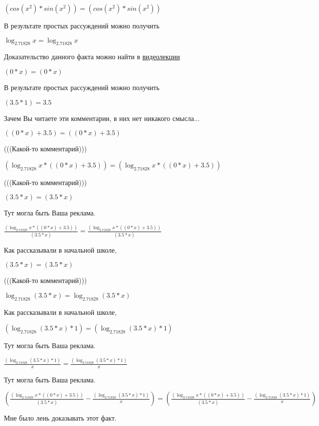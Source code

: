 \documentclass[12pt,a4paper,fleqn]{article}
\theoremstyle{definition}
\begin{document}
$(cos({ x }^{ 2 }) * sin({ x }^{ 2 })) = (cos({ x }^{ 2 }) * sin({ x }^{ 2 }))$

В результате простых рассуждений можно получить

$\log_{ 2.71828 }{ x } = \log_{ 2.71828 }{ x }$

Доказательство данного факта можно найти в \href{https://www.youtube.com/watch?v=dQw4w9WgXcQ}{видеолекции}

$( 0  *  x ) = ( 0  *  x )$

В результате простых рассуждений можно получить

$( 3.5  *  1 ) =  3.5 $

Зачем Вы читаете эти комментарии, в них нет никакого смысла...

$(( 0  *  x ) +  3.5 ) = (( 0  *  x ) +  3.5 )$

(((Какой-то комментарий)))

$(\log_{ 2.71828 }{ x } * (( 0  *  x ) +  3.5 )) = (\log_{ 2.71828 }{ x } * (( 0  *  x ) +  3.5 ))$

(((Какой-то комментарий)))

$( 3.5  *  x ) = ( 3.5  *  x )$

Тут могла быть Ваша реклама.

$\frac{(\log_{ 2.71828 }{ x } * (( 0  *  x ) +  3.5 ))}{( 3.5  *  x )}
 = \frac{(\log_{ 2.71828 }{ x } * (( 0  *  x ) +  3.5 ))}{( 3.5  *  x )}
$

Как рассказывали в начальной школе,

$( 3.5  *  x ) = ( 3.5  *  x )$

(((Какой-то комментарий)))

$\log_{ 2.71828 }{( 3.5  *  x )} = \log_{ 2.71828 }{( 3.5  *  x )}$

Как рассказывали в начальной школе,

$(\log_{ 2.71828 }{( 3.5  *  x )} *  1 ) = (\log_{ 2.71828 }{( 3.5  *  x )} *  1 )$

Тут могла быть Ваша реклама.

$\frac{(\log_{ 2.71828 }{( 3.5  *  x )} *  1 )}{ x }
 = \frac{(\log_{ 2.71828 }{( 3.5  *  x )} *  1 )}{ x }
$

Тут могла быть Ваша реклама.

$(\frac{(\log_{ 2.71828 }{ x } * (( 0  *  x ) +  3.5 ))}{( 3.5  *  x )}
 - \frac{(\log_{ 2.71828 }{( 3.5  *  x )} *  1 )}{ x }
) = (\frac{(\log_{ 2.71828 }{ x } * (( 0  *  x ) +  3.5 ))}{( 3.5  *  x )}
 - \frac{(\log_{ 2.71828 }{( 3.5  *  x )} *  1 )}{ x }
)$

Мне было лень доказывать этот факт.
\end{document}
